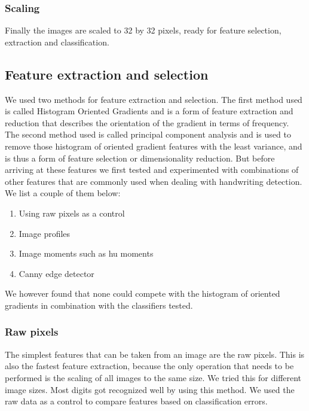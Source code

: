 \documentclass[%
        compressed,
        final,
        notitlepage,
        narroweqnarray,
        inline,
        twoside,
        ]{ieee}
\begin{document}
\subsubsection{Scaling}
Finally the images are scaled to 32 by 32 pixels, ready for feature selection, extraction and classification.
\subsection{Feature extraction and selection}
We used two methods for feature extraction and selection. The first method used
is called Histogram Oriented Gradients and is a form of feature extraction and
reduction that describes the orientation of the gradient in terms of frequency. The second method used is called principal component analysis and is used to remove those histogram of oriented gradient features with the least variance, and is thus a form of feature selection or dimensionality reduction. But before arriving at these features we first tested and experimented with combinations of other features that are commonly used when dealing with handwriting detection. We list a couple of them below:\\

    \begin{enumerate}
        \item Using raw pixels as a control
        \item Image profiles
        \item Image moments such as hu moments
        \item Canny edge detector\\
    \end{enumerate}
We however found that none could compete with the histogram of oriented gradients in combination with the classifiers tested.
    \subsubsection{Raw pixels}
The simplest features that can be taken from an image are the raw pixels. This
is also the fastest feature extraction, because the only operation that needs
to be performed is the scaling of all images to the same size. We tried this for
different image sizes. Most digits got recognized well by using this method.  We used the raw data as a control to compare features based on classification errors. 
\end{document}
